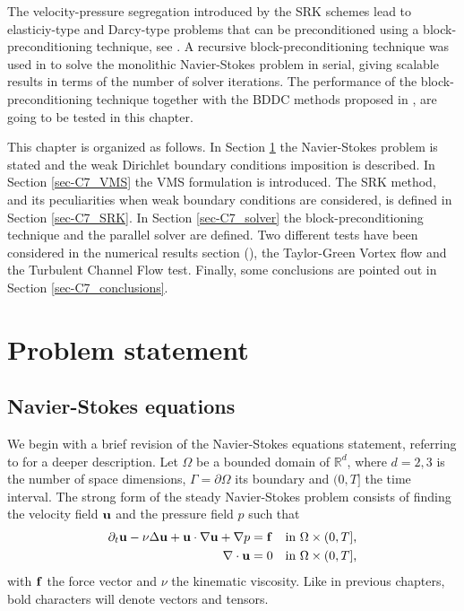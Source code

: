 The velocity-pressure segregation introduced by the SRK schemes lead to elasticiy-type and Darcy-type problems that can be preconditioned using a block-preconditioning technique, see \cite{badia_block_2014}. A recursive block-preconditioning technique was used in \cite{colomes_mixed_2015} to solve the monolithic Navier-Stokes problem in serial, giving scalable results in terms of the number of solver iterations. The performance of the block-preconditioning technique together with the BDDC methods proposed in \cite{alberto_f._martin_santiago_badia_and_javier_principe_multilevel_????}, are going to be tested in this chapter.

This chapter is organized as follows. In Section \ref{sec-C7_prob_statement} the Navier-Stokes problem is stated and the weak Dirichlet boundary conditions imposition is described. In Section \ref{sec-C7_VMS} the VMS formulation is introduced. The SRK method, and its peculiarities when weak boundary conditions are considered, is defined in Section \ref{sec-C7_SRK}. In Section \ref{sec-C7_solver} the block-preconditioning technique and the parallel solver are defined. Two different tests have been considered in the numerical results section (), the Taylor-Green Vortex flow and the Turbulent Channel Flow test. Finally, some conclusions are pointed out in Section \ref{sec-C7_conclusions}.

\section{Problem statement}
\label{sec-C7_prob_statement}
\subsection{Navier-Stokes equations}
\label{subsec:C7_NS_eq}
We begin with a brief revision of the Navier-Stokes equations statement, referring to  for a deeper description. Let $\Omega$ be a bounded domain of $\mathbb{R}^d$, where $d=2,3$ is the number of space dimensions, $\Gamma=\partial\Omega$ its boundary and $(0,T]$ the time interval. The strong form of the steady Navier-Stokes problem consists of finding the velocity field ${\bf u}$ and the pressure field $p$ such that 
\begin{align}
\label{eq-C7_NS_strong_mome}
\partial_t{\bf u}-\nu\Delta{\bf u}+{\bf u}\cdot\nabla{\bf u}+\nabla p&={\bf f}&\mbox{in $\Omega\times(0,T]$,}\\
\label{eq-C7_NS_strong_inc}
\nabla\cdot{\bf u}&=0&\mbox{in $\Omega\times(0,T]$,}
\end{align}
with ${\bf f}$ the force vector and $\nu$ the kinematic viscosity. Like in previous chapters, bold characters will denote vectors and tensors.


